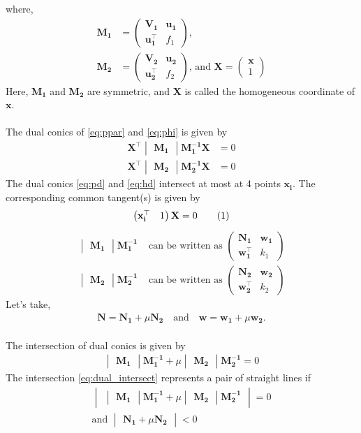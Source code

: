\documentclass[journal,12pt,twocolumn]{IEEEtran}
\let\vec\mathbf
\newcommand{\myvec}[1]{\ensuremath{\begin{pmatrix}#1\end{pmatrix}}}
\newcommand{\mydet}[1]{\ensuremath{\begin{vmatrix}#1\end{vmatrix}}}
\newcommand\numberthis{\addtocounter{equation}{1}\tag{\theequation}}
\begin{document}
where,
\begin{align*}
		\vec{M_1} &= \myvec{\vec{V_1}&\vec{u_1}\\\vec{u_1^{\top}}&f_1} \text{, } \\[0.5ex]
		\vec{M_2} &= \myvec{\vec{V_2}&\vec{u_2}\\\vec{u_2^{\top}}&f_2} \text{,} \text{ and } 
		\vec{X}=\myvec{\vec{x}\\1} 
\end{align*}
Here, $\vec{M_1}$ and $\vec{M_2}$ are symmetric, and $\vec{X}$ is called the homogeneous coordinate of $\vec{x}$. \\
\\
The dual conics of \eqref{eq:ppar} and \eqref{eq:phi} is given by
\begin{align}
		\vec{X^{\top}}\mydet{\vec{M_1}}\vec{M_1^{-1}}\vec{X} &= 0 \label{eq:pd} \\
		\vec{X^{\top}}\mydet{\vec{M_2}}\vec{M_2^{-1}}\vec{X} &= 0 \label{eq:hd} 
\end{align}
\newpage
The dual conics \eqref{eq:pd} and \eqref{eq:hd} intersect at most at 4 points $\vec{x_i}$. The corresponding common tangent(s) is given by \[ \myvec{\vec{x_i^{\top}}&1}\vec{X}=0 \label{eq:tangent_eqn} \numberthis \]
\begin{align*}
		\mydet{\vec{M_1}}\vec{M_1^{-1}} &\text{ can be written as } \myvec{\vec{N_1}&\vec{w_1}\\\vec{w_1^{\top}}&k_1} \\[0.5ex]
		\mydet{\vec{M_2}}\vec{M_2^{-1}} &\text{ can be written as } \myvec{\vec{N_2}&\vec{w_2}\\\vec{w_2^{\top}}&k_2}
\end{align*}
Let's take, 
\begin{align*}
		\vec{N} = \vec{N_1}+\mu\vec{N_2} \quad \text{and} \quad
		\vec{w} = \vec{w_1}+\mu\vec{w_2} \text{.}
\end{align*}
\\
The intersection of dual conics is given by
\begin{align}
\mydet{\vec{M_1}}\vec{M_1^{-1}}+\mu\mydet{\vec{M_2}}\vec{M_2^{-1}} = 0 \label{eq:dual_intersect}
\end{align}
The intersection \eqref{eq:dual_intersect} represents a pair of straight lines if 
\begin{gather*}
		\mydet{\mydet{\vec{M_1}}\vec{M_1^{-1}}+\mu\mydet{\vec{M_2}}\vec{M_2^{-1}}} = 0 \\
	\text{and }	\mydet{\vec{N_1}+\mu\vec{N_2}} < 0	
\end{gather*}
\end{document}
